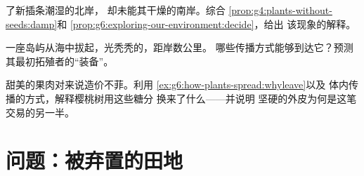 \begin{exercise}[$\star\star$]\label{exo:g6:how-plants-spread:10}
了新插条潮湿的北岸，
却未能其干燥的南岸。综合
\cref{prop:g4:plants-without-seeds:damp}和
\cref{prop:g6:exploring-our-environment:decide}，给出
该现象的解释。
\end{exercise}

\begin{exercise}[$\star\star$]\label{exo:g6:how-plants-spread:11}
一座岛屿从海中拔起，光秃秃的，距岸数公里。
哪些传播方式能够到达它？预测
其最初拓殖者的“装备”。
\end{exercise}

\begin{exercise}[$\star\star\star$]\label{exo:g6:how-plants-spread:12}
甜美的果肉对来说造价不菲。利用
\cref{ex:g6:how-plants-spread:whyleave}以及
体内传播的方式，解释樱桃树用这些糖分
换来了什么——并说明
坚硬的外皮为何是这笔交易的另一半。
\end{exercise}

\section{问题：被弃置的田地}

